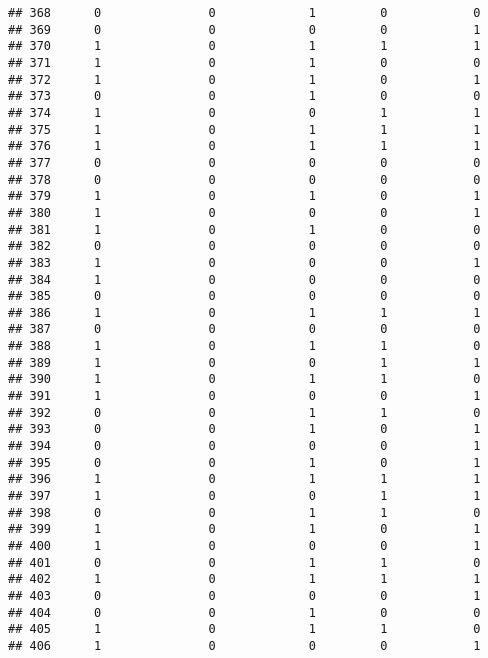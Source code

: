 \documentclass[]{article}
\begin{document}
\begin{verbatim}
## 368      0               0             1         0            0
## 369      0               0             0         0            1
## 370      1               0             1         1            1
## 371      1               0             1         0            0
## 372      1               0             1         0            1
## 373      0               0             1         0            0
## 374      1               0             0         1            1
## 375      1               0             1         1            1
## 376      1               0             1         1            1
## 377      0               0             0         0            0
## 378      0               0             0         0            0
## 379      1               0             1         0            1
## 380      1               0             0         0            1
## 381      1               0             1         0            0
## 382      0               0             0         0            0
## 383      1               0             0         0            1
## 384      1               0             0         0            0
## 385      0               0             0         0            0
## 386      1               0             1         1            1
## 387      0               0             0         0            0
## 388      1               0             1         1            0
## 389      1               0             0         1            1
## 390      1               0             1         1            0
## 391      1               0             0         0            1
## 392      0               0             1         1            0
## 393      0               0             1         0            1
## 394      0               0             0         0            1
## 395      0               0             1         0            1
## 396      1               0             1         1            1
## 397      1               0             0         1            1
## 398      0               0             1         1            0
## 399      1               0             1         0            1
## 400      1               0             0         0            1
## 401      0               0             1         1            0
## 402      1               0             1         1            1
## 403      0               0             0         0            1
## 404      0               0             1         0            0
## 405      1               0             1         1            0
## 406      1               0             0         0            1

\end{verbatim}
\end{document}
